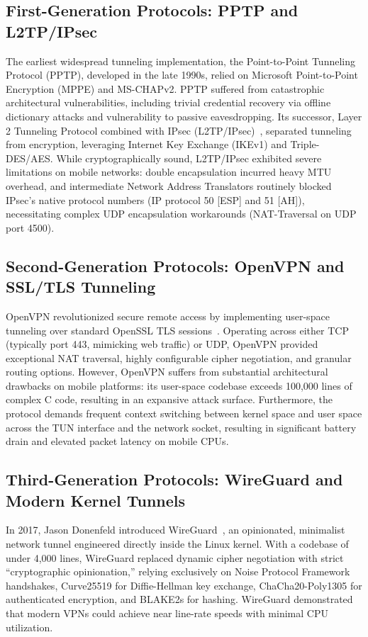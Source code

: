 \subsection{First-Generation Protocols: PPTP and L2TP/IPsec}
The earliest widespread tunneling implementation, the Point-to-Point Tunneling Protocol (PPTP), developed in the late 1990s, relied on Microsoft Point-to-Point Encryption (MPPE) and MS-CHAPv2. PPTP suffered from catastrophic architectural vulnerabilities, including trivial credential recovery via offline dictionary attacks and vulnerability to passive eavesdropping. Its successor, Layer 2 Tunneling Protocol combined with IPsec (L2TP/IPsec)~\cite{rfc4301}, separated tunneling from encryption, leveraging Internet Key Exchange (IKEv1) and Triple-DES/AES. While cryptographically sound, L2TP/IPsec exhibited severe limitations on mobile networks: double encapsulation incurred heavy MTU overhead, and intermediate Network Address Translators routinely blocked IPsec's native protocol numbers (IP protocol 50 [ESP] and 51 [AH]), necessitating complex UDP encapsulation workarounds (NAT-Traversal on UDP port 4500).

\subsection{Second-Generation Protocols: OpenVPN and SSL/TLS Tunneling}
OpenVPN revolutionized secure remote access by implementing user-space tunneling over standard OpenSSL TLS sessions~\cite{openvpn2024spec}. Operating across either TCP (typically port 443, mimicking web traffic) or UDP, OpenVPN provided exceptional NAT traversal, highly configurable cipher negotiation, and granular routing options. However, OpenVPN suffers from substantial architectural drawbacks on mobile platforms: its user-space codebase exceeds 100,000 lines of complex C code, resulting in an expansive attack surface. Furthermore, the protocol demands frequent context switching between kernel space and user space across the TUN interface and the network socket, resulting in significant battery drain and elevated packet latency on mobile CPUs.

\subsection{Third-Generation Protocols: WireGuard and Modern Kernel Tunnels}
In 2017, Jason Donenfeld introduced WireGuard~\cite{donenfeld2017wireguard}, an opinionated, minimalist network tunnel engineered directly inside the Linux kernel. With a codebase of under 4,000 lines, WireGuard replaced dynamic cipher negotiation with strict ``cryptographic opinionation,'' relying exclusively on Noise Protocol Framework handshakes, Curve25519 for Diffie-Hellman key exchange, ChaCha20-Poly1305 for authenticated encryption, and BLAKE2s for hashing. WireGuard demonstrated that modern VPNs could achieve near line-rate speeds with minimal CPU utilization.

